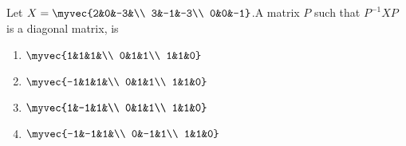     \item Let $X=\myvec{2&0&-3&\\
                        3&-1&-3\\
                        0&0&-1}$.A matrix $P$ such that $P^{-1}XP$ is a diagonal matrix, is
    \begin{enumerate}
        \item $\myvec{1&1&1&\\
                        0&1&1\\
                        1&1&0}$
        \item $\myvec{-1&1&1&\\
                        0&1&1\\
                        1&1&0}$
        \item $\myvec{1&-1&1&\\
                        0&1&1\\
                        1&1&0}$
        \item $\myvec{-1&-1&1&\\
                        0&-1&1\\
                        1&1&0}$
    \end{enumerate}


    

